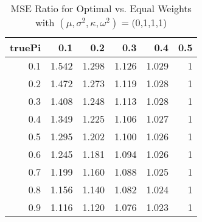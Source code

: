 \begin{table}

\caption{\label{tab:}MSE Ratio for Optimal vs. Equal Weights with $(\mu, \sigma^2, \kappa, \omega^2) = ($0,1,1,1)}
\centering
\begin{tabular}[t]{rrrrrr}
\toprule
truePi & 0.1 & 0.2 & 0.3 & 0.4 & 0.5\\
\midrule
0.1 & 1.542 & 1.298 & 1.126 & 1.029 & 1\\
0.2 & 1.472 & 1.273 & 1.119 & 1.028 & 1\\
0.3 & 1.408 & 1.248 & 1.113 & 1.028 & 1\\
0.4 & 1.349 & 1.225 & 1.106 & 1.027 & 1\\
0.5 & 1.295 & 1.202 & 1.100 & 1.026 & 1\\
0.6 & 1.245 & 1.181 & 1.094 & 1.026 & 1\\
0.7 & 1.199 & 1.160 & 1.088 & 1.025 & 1\\
0.8 & 1.156 & 1.140 & 1.082 & 1.024 & 1\\
0.9 & 1.116 & 1.120 & 1.076 & 1.023 & 1\\
\bottomrule
\end{tabular}
\end{table}
